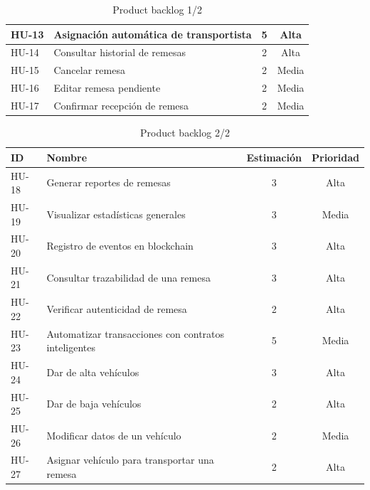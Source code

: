 \begin{table}[H]
\begin{tabularx}{\textwidth}{|l|X|c|c|}
        HU-13  & Asignación automática de transportista             & 5 & Alta  \\ \hline
        HU-14  & Consultar historial de remesas                     & 2 & Alta  \\ \hline
        HU-15  & Cancelar remesa                                    & 2 & Media \\ \hline
        HU-16 & Editar remesa pendiente                            & 2 & Media \\ \hline
        HU-17 & Confirmar recepción de remesa                      & 2 & Media \\ \hline

    \end{tabularx}
    \caption{Product backlog 1/2}
\end{table}

\begin{table}[H]
    \renewcommand{\arraystretch}{1.8}
    \centering
    \small
    \begin{tabularx}{\textwidth}{|l|X|c|c|}
        \hline
        \rowcolor[HTML]{9AFF99} 
        \textbf{ID} & \textbf{Nombre} & \textbf{Estimación} & \textbf{Prioridad} \\ \hline
        HU-18 & Generar reportes de remesas                        & 3 & Alta  \\ \hline
        HU-19 & Visualizar estadísticas generales                  & 3 & Media \\ \hline
        HU-20 & Registro de eventos en blockchain                  & 3 & Alta  \\ \hline
        HU-21 & Consultar trazabilidad de una remesa               & 3 & Alta  \\ \hline
        HU-22 & Verificar autenticidad de remesa                   & 2 & Alta  \\ \hline
        HU-23 & Automatizar transacciones con contratos inteligentes & 5 & Media \\ \hline
        HU-24 & Dar de alta vehículos                              & 3 & Alta  \\ \hline
        HU-25 & Dar de baja vehículos                              & 2 & Alta  \\ \hline
        HU-26 & Modificar datos de un vehículo                     & 2 & Media \\ \hline
        HU-27 & Asignar vehículo para transportar una remesa       & 2 & Alta  \\ \hline
    \end{tabularx}
    \caption{Product backlog 2/2}
\end{table}


